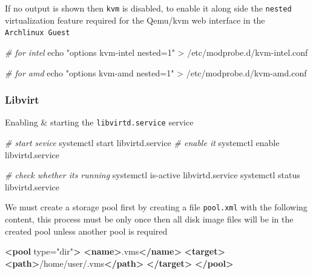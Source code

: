 \documentclass[
  14pt,
  english,
  a4paper,
]{scrreprt}
\newenvironment{Shaded}{}{}
\newcommand{\BuiltInTok}[1]{#1}
\newcommand{\CommentTok}[1]{\textcolor[rgb]{0.38,0.63,0.69}{\textit{#1}}}
\newcommand{\ExtensionTok}[1]{#1}
\newcommand{\KeywordTok}[1]{\textcolor[rgb]{0.00,0.44,0.13}{\textbf{#1}}}
\newcommand{\NormalTok}[1]{#1}
\newcommand{\OperatorTok}[1]{\textcolor[rgb]{0.40,0.40,0.40}{#1}}
\newcommand{\OtherTok}[1]{\textcolor[rgb]{0.00,0.44,0.13}{#1}}
\newcommand{\StringTok}[1]{\textcolor[rgb]{0.25,0.44,0.63}{#1}}
\begin{document}
If no output is shown then \texttt{kvm} is disabled, to enable it along
side the \texttt{nested} virtualization feature required for the
Qemu/kvm web interface in the \texttt{Archlinux\ Guest}

\begin{Shaded}
\begin{Highlighting}[]
\CommentTok{\# for intel}
\BuiltInTok{echo} \StringTok{"options kvm{-}intel nested=1"} \OperatorTok{\textgreater{}}\NormalTok{ /etc/modprobe.d/kvm{-}intel.conf}

\CommentTok{\# for amd}
\BuiltInTok{echo} \StringTok{"options kvm{-}amd nested=1"} \OperatorTok{\textgreater{}}\NormalTok{ /etc/modprobe.d/kvm{-}amd.conf}
\end{Highlighting}
\end{Shaded}

\hypertarget{libvirt-1}{%
\subsubsection{Libvirt}\label{libvirt-1}}

Enabling \& starting the \texttt{libvirtd.service} service

\begin{Shaded}
\begin{Highlighting}[]
\CommentTok{\# start sevice}
\ExtensionTok{systemctl}\NormalTok{ start libvirtd.service}
\CommentTok{\# enable it}
\ExtensionTok{systemctl}\NormalTok{ enable libvirtd.service}

\CommentTok{\# check whether it\textquotesingle{}s running}
\ExtensionTok{systemctl}\NormalTok{ is{-}active libvirtd.service}
\ExtensionTok{systemctl}\NormalTok{ status libvirtd.service}
\end{Highlighting}
\end{Shaded}

We must create a storage pool first by creating a file \texttt{pool.xml}
with the following content, this process must be only once then all disk
image files will be in the created pool unless another pool is required

\begin{Shaded}
\begin{Highlighting}[]
\KeywordTok{\textless{}pool}\OtherTok{ type=}\StringTok{"dir"}\KeywordTok{\textgreater{}}
  \KeywordTok{\textless{}name\textgreater{}}\NormalTok{.vms}\KeywordTok{\textless{}/name\textgreater{}}
  \KeywordTok{\textless{}target\textgreater{}}
    \KeywordTok{\textless{}path\textgreater{}}\NormalTok{/home/user/.vms}\KeywordTok{\textless{}/path\textgreater{}}
  \KeywordTok{\textless{}/target\textgreater{}}
\KeywordTok{\textless{}/pool\textgreater{}}
\end{Highlighting}
\end{Shaded}
\end{document}
